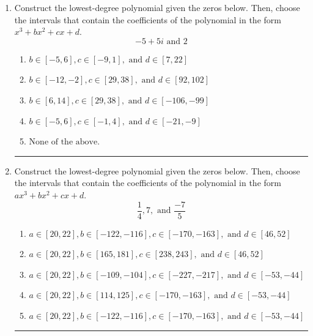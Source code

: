 \documentclass[14pt]{extbook}
\newcommand{\litem}[1]{\item#1\hspace*{-1cm}\rule{\textwidth}{0.4pt}}
\begin{document}
\begin{enumerate}
{\begin{enumerate}[label=\Alph*.]
\end{enumerate} }
\litem{
Construct the lowest-degree polynomial given the zeros below. Then, choose the intervals that contain the coefficients of the polynomial in the form $x^3+bx^2+cx+d$.\[ -5 + 5 i \text{ and } 2 \]\begin{enumerate}[label=\Alph*.]
\item \( b \in [-5, 6], c \in [-9, 1], \text{ and } d \in [7, 22] \)
\item \( b \in [-12, -2], c \in [29, 38], \text{ and } d \in [92, 102] \)
\item \( b \in [6, 14], c \in [29, 38], \text{ and } d \in [-106, -99] \)
\item \( b \in [-5, 6], c \in [-1, 4], \text{ and } d \in [-21, -9] \)
\item \( \text{None of the above.} \)

\end{enumerate} }
\litem{
Construct the lowest-degree polynomial given the zeros below. Then, choose the intervals that contain the coefficients of the polynomial in the form $ax^3+bx^2+cx+d$.\[ \frac{1}{4}, 7, \text{ and } \frac{-7}{5} \]\begin{enumerate}[label=\Alph*.]
\item \( a \in [20, 22], b \in [-122, -116], c \in [-170, -163], \text{ and } d \in [46, 52] \)
\item \( a \in [20, 22], b \in [165, 181], c \in [238, 243], \text{ and } d \in [46, 52] \)
\item \( a \in [20, 22], b \in [-109, -104], c \in [-227, -217], \text{ and } d \in [-53, -44] \)
\item \( a \in [20, 22], b \in [114, 125], c \in [-170, -163], \text{ and } d \in [-53, -44] \)
\item \( a \in [20, 22], b \in [-122, -116], c \in [-170, -163], \text{ and } d \in [-53, -44] \)


\end{enumerate}}
\end{enumerate}
\end{document}
